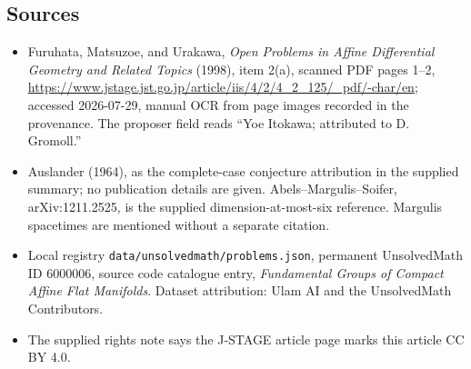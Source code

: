 \documentclass[11pt]{article}
\begin{document}
\subsection{Sources}
\begin{itemize}
\item Furuhata, Matsuzoe, and Urakawa, \emph{Open Problems in Affine Differential Geometry and Related Topics} (1998), item 2(a), scanned PDF pages 1--2, \url{https://www.jstage.jst.go.jp/article/iis/4/2/4_2_125/_pdf/-char/en}; accessed 2026-07-29, manual OCR from page images recorded in the provenance. The proposer field reads ``Yoe Itokawa; attributed to D. Gromoll.''
\item Auslander (1964), as the complete-case conjecture attribution in the supplied summary; no publication details are given. Abels--Margulis--Soifer, arXiv:1211.2525, is the supplied dimension-at-most-six reference. Margulis spacetimes are mentioned without a separate citation.
\item Local registry \texttt{data/unsolvedmath/problems.json}, permanent UnsolvedMath ID $6000006$, source code catalogue entry, \emph{Fundamental Groups of Compact Affine Flat Manifolds}. Dataset attribution: Ulam AI and the UnsolvedMath Contributors.
\item The supplied rights note says the J-STAGE article page marks this article CC BY 4.0.
\end{itemize}
\end{document}
